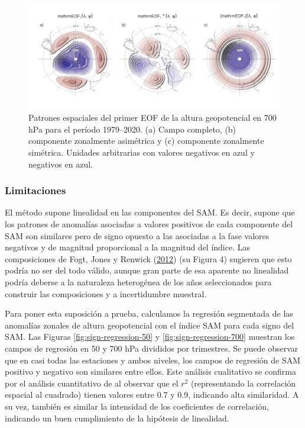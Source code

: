 \documentclass[12pt,oneside,a4paper]{reedthesis}
\begin{document}
\begin{figure}

{\centering \includegraphics{figures/30-sam/method-1} 

}

\caption{Patrones espaciales del primer EOF de la altura geopotencial en 700 hPa para el período 1979--2020. (a) Campo completo, (b) componente zonalmente asimétrica y (c) componente zonalmente simétrica. Unidades arbitrarias con valores negativos en azul y negativos en azul.}\label{fig:method}
\end{figure}

\hypertarget{limitaciones}{%
\subsubsection{Limitaciones}\label{limitaciones}}

El método supone linealidad en las componentes del SAM.
Es decir, supone que los patrones de anomalías asociadas a valores positivos de cada componente del SAM son similares pero de signo opuesto a las asociadas a la fase valores negativos y de magnitud proporcional a la magnitud del índice.
Las composiciones de Fogt, Jones y Renwick (\protect\hyperlink{ref-fogt2012}{2012}) (su Figura 4) sugieren que esto podría no ser del todo válido, aunque gran parte de esa aparente no linealidad podría deberse a la naturaleza heterogénea de los años seleccionados para construir las composiciones y a incertidumbre muestral.

Para poner esta suposición a prueba, calculamos la regresión segmentada de las anomalías zonales de altura geopotencial con el índice SAM para cada signo del SAM.
Las Figuras \ref{fig:sign-regression-50} y \ref{fig:sign-regression-700} muestran los campos de regresión en 50 y 700 hPa divididos por trimestres.
Se puede observar que en casi todas las estaciones y ambos niveles, los campos de regresión de SAM positivo y negativo son similares entre ellos.
Este análisis cualitativo se confirma por el análisis cuantitativo de al observar que el \(r^2\) (representando la correlación espacial al cuadrado) tienen valores entre 0.7 y 0.9, indicando alta similaridad.
A su vez, también es similar la intensidad de los coeficientes de correlación, indicando un buen cumplimiento de la hipótesis de linealidad.
\end{document}
